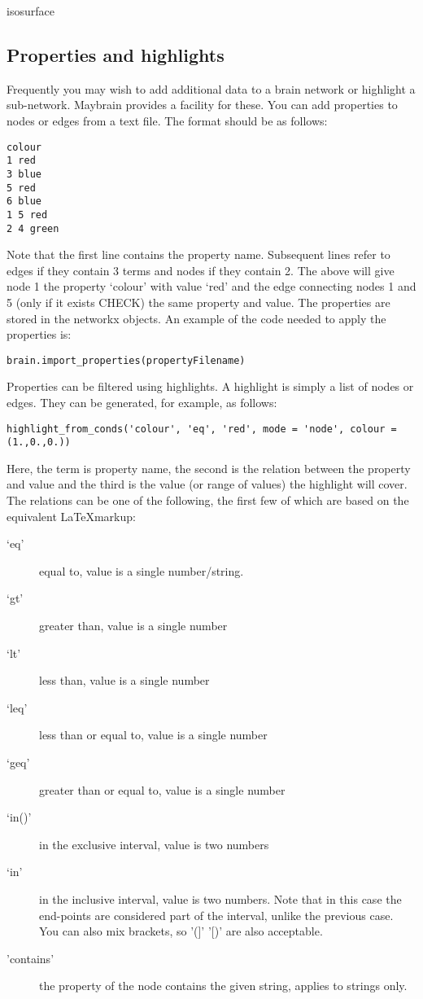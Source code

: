 \documentclass{report}
\begin{document}
isosurface

\subsection{Properties and highlights}
Frequently you may wish to add additional data to a brain network or highlight a sub-network. Maybrain provides a facility for these. You can add properties to nodes or edges from a text file. The format should be as follows:

\begin{verbatim}
colour
1 red
3 blue
5 red
6 blue
1 5 red
2 4 green
\end{verbatim}

\noindent Note that the first line contains the property name. Subsequent lines refer to edges if they contain 3 terms and nodes if they contain 2. The above will give node 1 the property `colour' with value `red' and the edge connecting nodes 1 and 5 (only if it exists CHECK) the same property and value. The properties are stored in the networkx objects. An example of the code needed to apply the properties is:

\begin{verbatim}
brain.import_properties(propertyFilename)
\end{verbatim}

Properties can be filtered using highlights. A highlight is simply a list of nodes or edges. They can be generated, for example, as follows:

\begin{verbatim}
highlight_from_conds('colour', 'eq', 'red', mode = 'node', colour = (1.,0.,0.))
\end{verbatim}

\noindent Here, the term is property name, the second is the relation between the property and value and the third is the value (or range of values) the highlight will cover. The relations can be one of the following, the first few of which are based on the equivalent \LaTeX  markup:

\begin{description}
\item[`eq'] equal to, value is a single number/string.
\item[`gt'] greater than, value is a single number
\item[`lt'] less than, value is a single number
\item[`leq'] less than or equal to, value is a single number
\item[`geq'] greater than or equal to, value is a single number
\item[`in()'] in the exclusive interval, value is two numbers
\item[`in\lbrack\rbrack'] in the inclusive interval, value is two numbers. Note that in this case the end-points are considered part of the interval, unlike the previous case. You can also mix brackets, so '(]' '[)' are also acceptable.
\item['contains'] the property of the node contains the given string, applies to strings only.
\end{description} 
\end{document}
